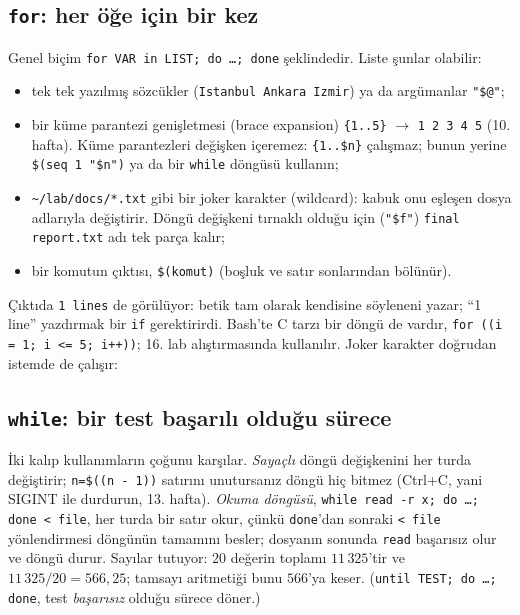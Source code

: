 \documentclass[11pt,a4paper]{article}
\begin{document}
\subsection{\texttt{for}: her öğe için bir kez}




Genel biçim \texttt{for VAR in LIST; do \ldots; done} şeklindedir. Liste şunlar olabilir:
\begin{itemize}
  \item tek tek yazılmış sözcükler (\texttt{Istanbul Ankara Izmir}) ya da argümanlar \texttt{"\$@"};
  \item bir küme parantezi genişletmesi (brace expansion) \texttt{\{1..5\}} $\to$ \texttt{1 2 3 4 5} (10. hafta). Küme parantezleri değişken içeremez: \texttt{\{1..\$n\}} çalışmaz; bunun yerine \texttt{\$(seq 1 "\$n")} ya da bir \texttt{while} döngüsü kullanın;
  \item \texttt{\textasciitilde/lab/docs/*.txt} gibi bir joker karakter (wildcard): kabuk onu eşleşen dosya adlarıyla değiştirir. Döngü değişkeni tırnaklı olduğu için (\texttt{"\$f"}) \texttt{final report.txt} adı tek parça kalır;
  \item bir komutun çıktısı, \texttt{\$(komut)} (boşluk ve satır sonlarından bölünür).
\end{itemize}
Çıktıda \texttt{1 lines} de görülüyor: betik tam olarak kendisine söyleneni yazar; “1 line” yazdırmak bir \texttt{if} gerektirirdi. Bash'te C tarzı bir döngü de vardır, \texttt{for ((i = 1; i <= 5; i++))}; 16. lab alıştırmasında kullanılır. Joker karakter doğrudan istemde de çalışır:


\subsection{\texttt{while}: bir test başarılı olduğu sürece}




İki kalıp kullanımların çoğunu karşılar. \emph{Sayaçlı} döngü değişkenini her turda değiştirir; \texttt{n=\$((n - 1))} satırını unutursanız döngü hiç bitmez (Ctrl+C, yani SIGINT ile durdurun, 13. hafta). \emph{Okuma döngüsü}, \texttt{while read -r x; do \ldots; done < file}, her turda bir satır okur, çünkü \texttt{done}'dan sonraki \texttt{< file} yönlendirmesi döngünün tamamını besler; dosyanın sonunda \texttt{read} başarısız olur ve döngü durur. Sayılar tutuyor: $20$ değerin toplamı $11\,325$'tir ve $11\,325 / 20 = 566{,}25$; tamsayı aritmetiği bunu $566$'ya keser. (\texttt{until TEST; do \ldots; done}, test \emph{başarısız} olduğu sürece döner.)
\end{document}
